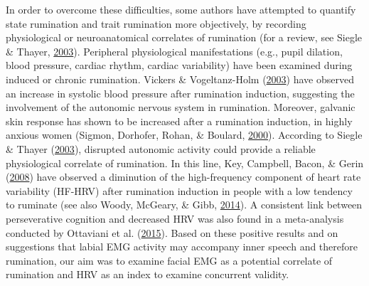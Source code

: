 \documentclass[a4paper,12pt,twoside,openright,oldfontcommands]{memoir}
\begin{document}
In order to overcome these difficulties, some authors have attempted to
quantify state rumination and trait rumination more objectively, by
recording physiological or neuroanatomical correlates of rumination (for
a review, see Siegle \& Thayer,
\protect\hyperlink{ref-papageorgiou_physiological_2003}{2003}).
Peripheral physiological manifestations (e.g., pupil dilation, blood
pressure, cardiac rhythm, cardiac variability) have been examined during
induced or chronic rumination. Vickers \& Vogeltanz-Holm
(\protect\hyperlink{ref-vickers_effects_2003}{2003}) have observed an
increase in systolic blood pressure after rumination induction,
suggesting the involvement of the autonomic nervous system in
rumination. Moreover, galvanic skin response has shown to be increased
after a rumination induction, in highly anxious women (Sigmon, Dorhofer,
Rohan, \& Boulard, \protect\hyperlink{ref-sigmon_impact_2000}{2000}).
According to Siegle \& Thayer
(\protect\hyperlink{ref-papageorgiou_physiological_2003}{2003}),
disrupted autonomic activity could provide a reliable physiological
correlate of rumination. In this line, Key, Campbell, Bacon, \& Gerin
(\protect\hyperlink{ref-Key2008}{2008}) have observed a diminution of
the high-frequency component of heart rate variability (HF-HRV) after
rumination induction in people with a low tendency to ruminate (see also
Woody, McGeary, \& Gibb,
\protect\hyperlink{ref-woody_brooding_2014}{2014}). A consistent link
between perseverative cognition and decreased HRV was also found in a
meta-analysis conducted by Ottaviani et al.
(\protect\hyperlink{ref-Ottaviani2015}{2015}). Based on these positive
results and on suggestions that labial EMG activity may accompany inner
speech and therefore rumination, our aim was to examine facial EMG as a
potential correlate of rumination and HRV as an index to examine
concurrent validity.
\end{document}
